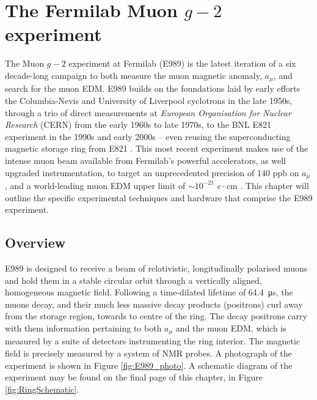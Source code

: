 \chapter[The Fermilab Muon $g-2$ experiment]{The Fermilab Muon $g-2$\\ experiment}\label{chap:3}

The Muon $g-2$ experiment at Fermilab (E989) is the latest iteration of a six decade-long campaign to both measure the muon magnetic anomaly, $a_{\mu}$, and search for the muon EDM. E989 builds on the foundations laid by early efforts the Columbia-Nevis and University of Liverpool cyclotrons in the late 1950s, through a trio of direct measurements at \textit{European Organisation for Nuclear Research} (CERN) from the early 1960s to late 1970s, to the BNL E821 experiment in the 1990s and early 2000s -- even reusing the superconducting magnetic storage ring from E821 \cite[and references therein]{LeeHistory}. This most recent experiment makes use of the intense muon beam available from Fermilab's powerful accelerators, as well upgraded instrumentation, to target an unprecedented precision of 140 ppb on $a_{\mu}$, and a world-leading muon EDM upper limit of $\sim10^{-21}$ $e\cdot$cm \cite{TDR}. This chapter will outline the specific experimental techniques and hardware that comprise the E989 experiment.

\section{Overview}

E989 is designed to receive a beam of relativistic, longitudinally polarised muons and hold them in a stable circular orbit through a vertically aligned, homogeneous magnetic field. Following a time-dilated lifetime of \SI{64.4}{\micro\second}, the muons decay, and their much less massive decay products (positrons) curl away from the storage region, towards to centre of the ring. The decay positrons carry with them information pertaining to both $a_{\mu}$ and the muon EDM, which is measured by a suite of detectors instrumenting the ring interior. The magnetic field is precisely measured by a system of NMR probes. A photograph of the experiment is shown in Figure \ref{fig:E989_photo}. A schematic diagram of the experiment may be found on the final page of this chapter, in Figure \ref{fig:RingSchematic}.

